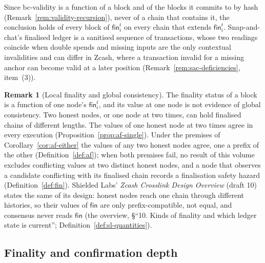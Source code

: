 \documentclass[11pt,a4paper]{article}
\theoremstyle{definition}
\newtheorem{remark}[theorem]{Remark}
\newcommand{\fin}{\mathsf{fin}}
\begin{document}
Since bc-validity is a function of a block and of the blocks it commits to by
hash (Remark~\ref{rem:validity-recursion}), never of a chain that contains
it, the conclusion holds of every block of $\fin_i^t$ on every chain that
extends $\fin_i^t$. Snap-and-chat's finalised ledger is a sanitised sequence
of transactions, whose two readings coincide when double spends and missing
inputs are the only contextual invalidities and can differ in Zcash, where a
transaction invalid for a missing anchor can become valid at a later position
(Remark~\ref{rem:sac-deficiencies}, item~(3)).

\begin{remark}[Local finality and global consistency]%
\label{rem:local-not-global}
The finality status of a block is a function of one node's $\fin_i^t$, and
its value at one node is not evidence of global consistency. Two honest
nodes, or one node at two times, can hold finalised chains of different
lengths. The values of one honest node at two times agree in every execution
(Proposition~\ref{prop:af-single}). Under the premises of
Corollary~\ref{cor:af-either} the values of any two honest nodes agree, one a
prefix of the other (Definition~\ref{def:af}); when both premises fail, no
result of this volume excludes conflicting values at two distinct honest
nodes, and a node that observes a candidate conflicting with its finalised
chain records a finalisation safety hazard (Definition~\ref{def:fin}).
Shielded Labs' \emph{Zcash Crosslink Design Overview} (draft 10) states the same
of its design: honest nodes reach one chain through different histories, so
their values of $\fin$ are only prefix-compatible, not equal, and consensus
never reads $\fin$ (the overview, \S``10. Kinds of finality and which ledger
state is current''; Definition~\ref{def:sl-quantities}).
\end{remark}

\subsection{Finality and confirmation depth}\label{sec:k-depth}
\end{document}
